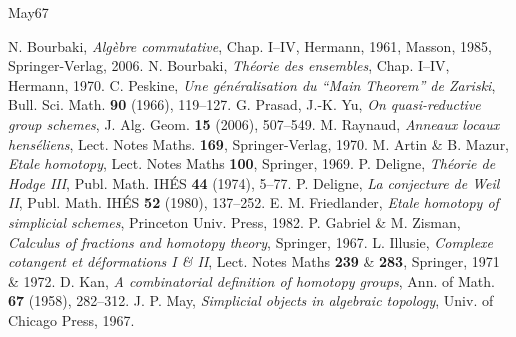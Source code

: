 \begin{thebibliography}{May67}
\item[]
 N. Bourbaki, \emph{Algèbre commutative}, Chap. I--IV, Hermann, 1961, Masson, 1985, Springer-Verlag, 2006.
 N. Bourbaki, \emph{Théorie des ensembles}, Chap. I--IV, Hermann, 1970.
 C. Peskine, \emph{Une généralisation du ``Main Theorem'' de Zariski}, Bull. Sci. Math. \textbf{90} (1966), 119--127.
 G. Prasad, J.-K. Yu, \emph{On quasi-reductive group schemes}, J. Alg. Geom. \textbf{15} (2006), 507--549.
 M. Raynaud, \emph{Anneaux locaux henséliens}, Lect. Notes Maths. \textbf{169}, Springer-Verlag, 1970.
 M. Artin \& B. Mazur, \emph{Etale homotopy}, Lect. Notes Maths \textbf{100}, Springer, 1969.
 P. Deligne, \emph{Théorie de Hodge III}, Publ. Math. IHÉS \textbf{44} (1974), 5--77.
 P. Deligne, \emph{La conjecture de Weil II}, Publ. Math. IHÉS \textbf{52} (1980), 137--252.
 E. M. Friedlander, \emph{Etale homotopy of simplicial schemes}, Princeton Univ. Press, 1982.
 P. Gabriel \& M. Zisman, \emph{Calculus of fractions and homotopy theory}, Springer, 1967.
 L. Illusie, \emph{Complexe cotangent et déformations I \& II}, Lect. Notes Maths \textbf{239} \& \textbf{283}, Springer, 1971 \& 1972.
 D. Kan, \emph{A combinatorial definition of homotopy groups}, Ann. of Math. \textbf{67} (1958), 282--312.
 J. P. May, \emph{Simplicial objects in algebraic topology}, Univ. of Chicago Press, 1967.
\end{thebibliography}
